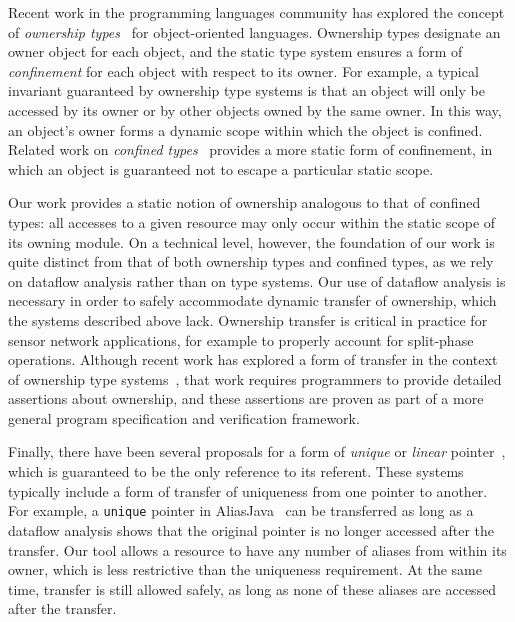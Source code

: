 Recent work in the programming languages community has explored the
concept of {\em ownership
types}~\cite{ownership,ownership2,BoyapatiEtAl02,aliasjava} for
object-oriented languages.  Ownership types designate an owner object
for each object, and the static type system ensures a form of {\em
confinement} for each object with respect to its owner.  For example,
a typical invariant guaranteed by ownership type systems is that an
object will only be accessed by its owner or by other objects owned by
the same owner.  In this way, an object's owner forms a dynamic scope
within which the object is confined.  Related work on {\em confined
types}~\cite{confined1,confined2} provides a more static form of
confinement, in which an object is guaranteed not to escape a
particular static scope.


Our work provides a static notion of ownership analogous to that of
confined types:  all accesses to a given resource may only occur
within the static scope of its owning module.  On a technical level,
however, the foundation of our work is quite distinct from that of
both ownership types and confined types, as we rely on dataflow
analysis rather than on type systems.  Our use of dataflow analysis is
necessary in order to safely accommodate dynamic transfer of
ownership, which the systems described above lack.  Ownership transfer
is critical in practice for sensor network applications, for example
to properly account for split-phase operations.  Although recent work
has explored a form of transfer in the context of ownership type
systems~\cite{DBLP:conf/ecoop/BanerjeeN05}, that work requires
programmers to provide detailed assertions about ownership, and these
assertions are proven as part of a more general program specification
and verification framework.


Finally, there have been several proposals for a form of {\em unique}
or {\em linear}
pointer~\cite{Boyland:2001:ABU,aliasjava,Wad90:linear,adoption-focus},
which is guaranteed to be the only reference to its referent.  These
systems typically include a form of transfer of uniqueness from one
pointer to another.  For example, a {\tt unique} pointer in
AliasJava~\cite{aliasjava} can be transferred as long as a dataflow
analysis shows that the original pointer is no longer accessed after
the transfer.  Our tool allows a resource to have any number of
aliases from within its owner, which is less restrictive than the
uniqueness requirement.  At the same time, transfer is still allowed
safely, as long as none of these aliases are accessed after the
transfer.

